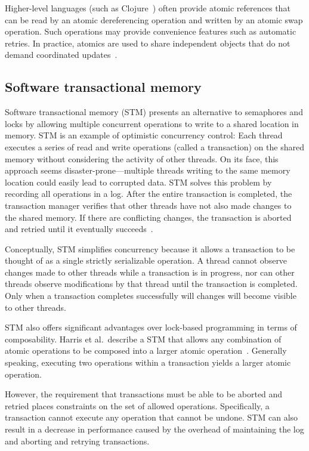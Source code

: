 \documentclass{sig-alternate}
\begin{document}
Higher-level languages (such as Clojure~\cite{Swalens2014}) often provide atomic references that can be read by an atomic dereferencing operation and written by an atomic swap operation. Such operations may provide convenience features such as automatic retries. In practice, atomics are used to share independent objects that do not demand coordinated updates~\cite{Swalens2014}.

\subsection{Software transactional memory}

Software transactional memory (STM) presents an alternative to semaphores and locks by allowing multiple concurrent operations to write to a shared location in memory. STM is an example of optimistic concurrency control: Each thread executes a series of read and write operations (called a transaction) on the shared memory without considering the activity of other threads. On its face, this approach seems disaster-prone---multiple threads writing to the same memory location could easily lead to corrupted data. STM solves this problem by recording all operations in a log. After the entire transaction is completed, the transaction manager verifies that other threads have not also made changes to the shared memory. If there are conflicting changes, the transaction is aborted and retried until it eventually succeeds~\cite{Shavit1995}.

Conceptually, STM simplifies concurrency because it allows a transaction to be thought of as a single strictly serializable operation. A thread cannot observe changes made to other threads while a transaction is in progress, nor can other threads observe modifications by that thread until the transaction is completed. Only when a transaction completes successfully will changes will become visible to other threads.

STM also offers significant advantages over lock-based programming in terms of composability. Harris et al.\ describe a STM that allows any combination of atomic operations to be composed into a larger atomic operation~\cite{Harris2005}. Generally speaking, executing two operations within a transaction yields a larger atomic operation.

However, the requirement that transactions must be able to be aborted and retried places constraints on the set of allowed operations. Specifically, a transaction cannot execute any operation that cannot be undone. STM can also result in a decrease in performance caused by the overhead of maintaining the log and aborting and retrying transactions.
\end{document}
